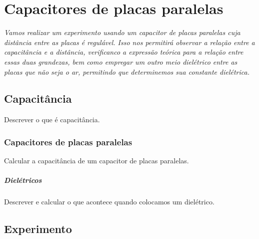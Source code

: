 \chapter{Capacitores de placas paralelas} %
\label{Chap:CapacPlacasPar}        %

\begin{fullwidth}\it
	Vamos realizar um experimento usando um capacitor de placas paralelas cuja distância entre as placas é regulável. Isso nos permitirá observar a relação entre a capacitância e a distância, verificanco a expressão teórica para a relação entre essas duas grandezas, bem como empregar um outro meio dielétrico entre as placas que não seja o ar, permitindo que determinemos sua constante dielétrica.
\end{fullwidth}

\section{Capacitância}

Descrever o que é capacitância.

\subsection{Capacitores de placas paralelas}

Calcular a capacitância de um capacitor de placas paralelas.

\paragraph{Dielétricos}

Descrever e calcular o que acontece quando colocamos um dielétrico.

\section{Experimento}

